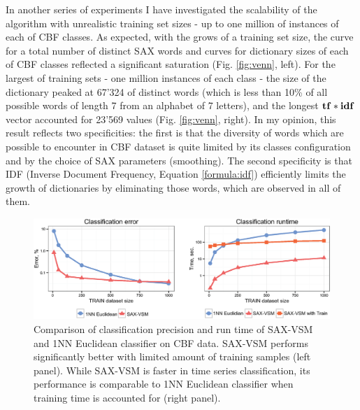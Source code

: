 In another series of experiments I have investigated the scalability of the algorithm with
unrealistic training set sizes - up to one million of instances of each of CBF classes.
As expected, with the grows of a training set size, the curve for a total number of distinct SAX
words and curves for dictionary sizes of each of CBF classes reflected a significant saturation 
(Fig. \ref{fig:venn}, left). For the largest of training sets - one million instances of each
class - the size of the dictionary peaked at 67'324 of distinct words (which is less than 10\% of
all possible words of length 7 from an alphabet of 7 letters), 
and the longest $\text{\textbf{tf}}\ast\text{\textbf{idf}}$ vector 
accounted for 23'569 values (Fig. \ref{fig:venn}, right). In my opinion, this result reflects two
specificities: the first is that the diversity of words which are possible to encounter in 
CBF dataset is quite limited by its classes configuration and by the choice of SAX parameters 
(smoothing). 
The second specificity is that IDF (Inverse Document Frequency, Equation \ref{formula:idf})
efficiently limits the growth of dictionaries by eliminating those words, which are observed in all
of them.

\begin{figure}[ht]
   \centering
   \includegraphics[width=120mm]{figures/precision-runtime.eps}
   \caption{Comparison of classification precision and run time of SAX-VSM and 1NN 
   Euclidean classifier on CBF data. SAX-VSM performs significantly better with limited 
   amount of training samples (left panel). While SAX-VSM is faster in time series 
   classification, its performance is comparable to 1NN Euclidean classifier when 
   training time is accounted for (right panel).}
   \label{fig:precision-runtime}
\end{figure}


